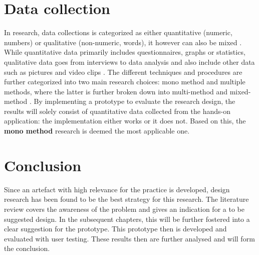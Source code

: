 
\section{Data collection}

In research, data collections is categorized as either quantitative (numeric, numbers) or qualitative (non-numeric, words), it however can also be mixed \citep{Saunders2009}. While quantitative data primarily includes questionnaires, graphs or statistics, qualitative data goes from interviews to data analysis and also include other data such as pictures and video clips \citep{Saunders2009}. The different techniques and procedures are further categorized into two main research choices: mono method and multiple methods, where the latter is further broken down into multi-method and mixed-method \citep{Saunders2009}. By implementing a prototype to evaluate the research design, the results will solely consist of quantitative data collected from the hands-on application: the implementation either works or it does not. Based on this, the \textbf{mono method} research is deemed the most applicable one.







\section{Conclusion}

Since an artefact with high relevance for the practice is developed, design research has been found to be the best strategy for this research. The literature review covers the awareness of the problem and gives an indication for a to be suggested design. In the subsequent chapters, this will be further fostered into a clear suggestion for the prototype. This prototype then is developed and evaluated with user testing. These results then are further analysed and will form the conclusion.
